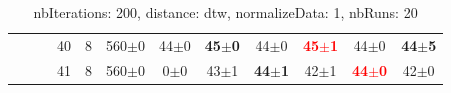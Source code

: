 \begin{table}
\begin{center}
\begin{tabular}{lllccccccccc}
 &  &  & 40 &  8 &   560$\pm$0 & 44$\pm$0 & \textbf{45$\pm$0} & 44$\pm$0 & \textbf{\textcolor{red}{45$\pm$1}} & 44$\pm$0 & \textbf{44$\pm$5} \\ 
 &  &  & 41 &  8 &   560$\pm$0 &  0$\pm$0 & 43$\pm$1 & \textbf{44$\pm$1} & 42$\pm$1 & \textbf{\textcolor{red}{44$\pm$0}} & 42$\pm$0 \\ 
\end{tabular} 
\end{center} 
\caption{nbIterations: 200, distance: dtw, normalizeData: 1, nbRuns: 20} 
\label{nbit200DidtNoda1Nbru20} 
\end{table} 
 
